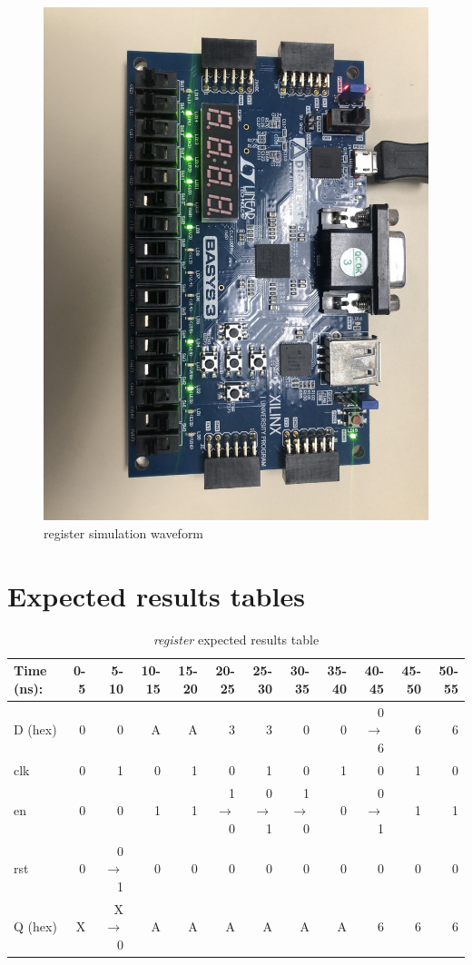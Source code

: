 \documentclass[11pt]{article}
\begin{document}
\begin{figure}[ht]\centering
	\includegraphics[width= \textwidth ]{bb8.png}
	\caption{register simulation waveform}
	\label{fig: bb8}
\end{figure}
\section*{Expected results tables}

\begin{table}[ht]\centering
	\caption{\textit{register} expected results table}
	\label{ALU:tbl:register_ERT}\medskip
	\begin{tabular}{l|rrrrrrrrrrr}
		Time (ns): & 0-5 & 5-10 & 10-15 & 15-20 & 20-25 & 25-30 & 30-35 & 35-40 & 40-45 & 45-50 & 50-55 \\
		\midrule
		D (hex) & 0 & 0 	  & A & A & 3 	    & 3 	  & 0 	    & 0 & 0$\to$6 & 6 & 6 \\
		clk     & 0 & 1 	  & 0 & 1 & 0 	    & 1 	  & 0 	    & 1 & 0 	  & 1 & 0 \\
		en  	& 0 & 0 	  & 1 & 1 & 1$\to$0 & 0$\to$1 & 1$\to$0 & 0 & 0$\to$1 & 1 & 1 \\
		rst 	& 0 & 0$\to$1 & 0 & 0 & 0 		& 0 	  & 0		& 0 & 0		  & 0 & 0 \\
		\midrule
		Q (hex) & X & X$\to$0 & A & A & A & A & A & A & 6 & 6 &  6\\
		\bottomrule
	\end{tabular}
\end{table}
\end{document}
